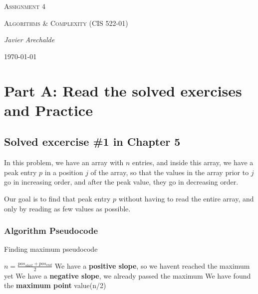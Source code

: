 \documentclass{article}
\begin{document}
\begin{titlepage}
	\centering
	{\scshape\LARGE Assignment 4\par}
	\vspace{1cm}
	{\scshape\Large Algorithms \& Complexity (CIS 522-01)\par}
	\vspace{1.5cm}
	{\Large\itshape Javier Arechalde\par}
	\vfill
	{\large \today\par}
\end{titlepage}

\section*{Part A: Read the solved exercises and Practice}

\subsection*{Solved excercise \#1 in Chapter 5}

In this problem, we have an array with $n$ entries, and inside this array, we have a peak entry $p$ in a position $j$ of the array, so that the values in the array prior to $j$ go in increasing order, and after the peak value, they go in decreasing order.

Our goal is to find that peak entry $p$ without having to read the entire array, and only by reading as few values as possible. 

\subsubsection*{Algorithm Pseudocode}

\begin{algorithm}[H]
\caption{Finding maximum pseudocode}
\begin{algorithmic}[1]
 \State $n = \frac{pos_{start}+pos_{end}}{2}$
  \State We have a \textbf{positive slope}, so we havent reached the maximum yet
  \State {}
  \State We have a \textbf{negative slope}, we already passed the maximum
  \State {}
  \State We have found the \textbf{maximum point}
  \State \Return value(n/2)
 \EndIf
\EndFunction
\end{algorithmic}
\end{algorithm}
\end{document}
